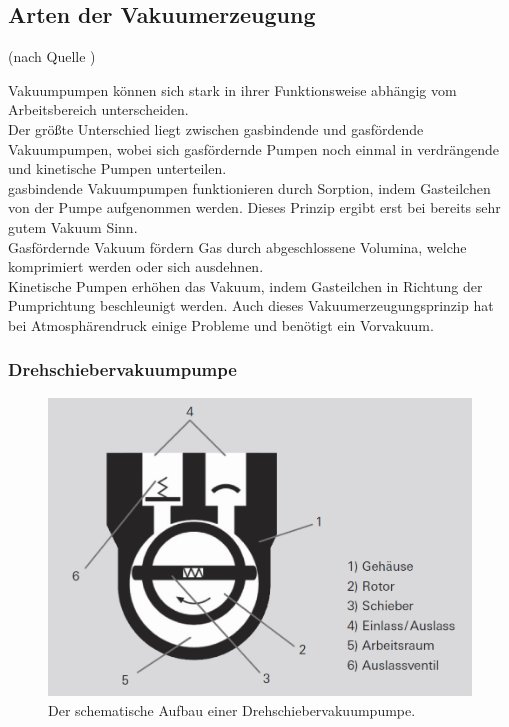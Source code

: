 	\subsection{Arten der Vakuumerzeugung}(nach Quelle \cite{peiffer})
		
		\noindent
		Vakuumpumpen können sich stark in ihrer Funktionsweise abhängig vom Arbeitsbereich unterscheiden.\\	
		Der größte Unterschied liegt zwischen gasbindende und gasfördende Vakuumpumpen, wobei sich gasfördernde Pumpen noch einmal in verdrängende und kinetische Pumpen unterteilen.\\
		gasbindende Vakuumpumpen funktionieren durch Sorption, indem Gasteilchen von der Pumpe aufgenommen werden. 
		Dieses Prinzip ergibt erst bei bereits sehr gutem Vakuum Sinn.  \\
		Gasfördernde Vakuum fördern Gas durch abgeschlossene Volumina, welche komprimiert werden oder sich ausdehnen.\\
		Kinetische Pumpen erhöhen das Vakuum, indem Gasteilchen in Richtung der Pumprichtung beschleunigt werden.
		Auch dieses Vakuumerzeugungsprinzip hat bei Atmosphärendruck einige Probleme und benötigt ein Vorvakuum.

		\subsubsection{Drehschiebervakuumpumpe} 
						
			\begin{figure}
				\centering
				\includegraphics[width=0.5\linewidth]{"latex/images/Drehschieber.png"}
				\caption{Der schematische Aufbau einer Drehschiebervakuumpumpe.}
				\label{fig:dreh}
			\end{figure}  


